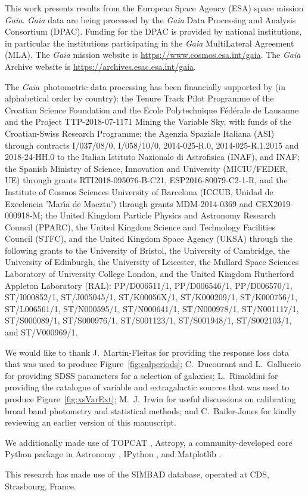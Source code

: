 \documentclass{aa}
\newcommand{\gaia}{\textit{Gaia}\xspace}
\newcommand{\afigref}[1]{Figure~\ref{fig:#1}}
\begin{document}
\begin{acknowledgements}

This work presents results from the European Space Agency (ESA) space mission \textit{Gaia}. 
\textit{Gaia} data are being processed by the \textit{Gaia} Data Processing and Analysis Consortium (DPAC). 
Funding for the DPAC is provided by national institutions, in particular the institutions participating in the \textit{Gaia} MultiLateral Agreement (MLA). 
The \textit{Gaia} mission website is \url{https://www.cosmos.esa.int/gaia}. 
The \textit{Gaia} Archive website is \url{https://archives.esac.esa.int/gaia}.

The \gaia\ photometric data processing has been financially supported by (in alphabetical order by country):
%
the Tenure Track Pilot Programme of the Croatian Science Foundation and the Ecole Polytechnique Fédérale de Lausanne and the Project TTP-2018-07-1171 Mining the Variable Sky, with funds of the Croatian-Swiss Research Programme;
%
the Agenzia Spaziale Italiana (ASI) through contracts I/037/08/0, I/058/10/0, 2014-025-R.0,
2014-025-R.1.2015  and 2018-24-HH.0 to the Italian Istituto Nazionale di Astrofisica (INAF), 
and INAF;
the Spanish Ministry of Science, Innovation and University (MICIU/FEDER, UE) through grants RTI2018-095076-B-C21, ESP2016-80079-C2-1-R, and the Institute of Cosmos Sciences University of Barcelona (ICCUB, Unidad de Excelencia ’Mar\'{\i}a de Maeztu’) through grants MDM-2014-0369 and CEX2019-000918-M;
%
the United Kingdom Particle Physics and Astronomy Research Council (PPARC), the United Kingdom Science and Technology Facilities Council (STFC), and the United Kingdom Space Agency (UKSA) through the following grants to the University of Bristol, the University of Cambridge, the University of Edinburgh, the University of Leicester, the Mullard Space Sciences Laboratory of University College London, and the United Kingdom Rutherford Appleton Laboratory (RAL): PP/D006511/1, PP/D006546/1, PP/D006570/1, ST/I000852/1, ST/J005045/1, ST/K00056X/1, ST/K000209/1, ST/K000756/1, ST/L006561/1, ST/N000595/1, ST/N000641/1, ST/N000978/1, ST/N001117/1, ST/S000089/1, ST/S000976/1, ST/S001123/1, ST/S001948/1, ST/S002103/1, and ST/V000969/1.

We would like to thank J.~Martin-Fleitas for providing the response loss data that was used to produce \afigref{calperiods}; C.~Ducourant and L.~Galluccio for providing SDSS parameters for a selection of galaxies; L.~Rimoldini for providing the catalogue of variable and extragalactic sources that was used to produce \afigref{xsVarExt}; M.~J.~Irwin for useful discussions on calibrating broad band photometry and statistical methods; and C.~Bailer-Jones for kindly reviewing an earlier version of this manuscript.

We additionally made use of TOPCAT \citep[\url{http://www.starlink.ac.uk/topcat/}]{TOPCAT}, Astropy, a community-developed core Python package in Astronomy \citep{ASTROPY}, IPython \citep{IPYTHON}, and Matplotlib \citep{MATPLOTLIB}.

This research has made use of the SIMBAD database, operated at CDS, Strasbourg, France.

\end{acknowledgements}
\end{document}
